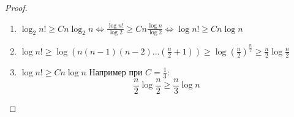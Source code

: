 \begin{proof}
$ $\newline
{\em\begin{enumerate}
    \item  ${\log_2{n!} \ge Cn\log_2{n} \Leftrightarrow 
   \frac{\log{n!}}{\log{2}} \ge Cn\frac{\log{n}}{\log{2}} \Leftrightarrow \log{n!} \ge Cn\log{n}}$
    \item $\log{n!} \ge \log {(n(n-1)(n-2)...(\frac{n}{2} +1))} \ge  \log{(\frac{n}{2})^\frac{n}{2}} \ge  \frac{n}{2} \log{\frac{n}{2}}$
    \item  $\log{n!} \ge Cn\log{n}$ Например при $C = \frac{1}{3}$: $$\frac{n}{2}\log{\frac{n}{2}} \ge \frac{n}{3} \log{n}$$
\end{enumerate}
}

\end{proof}